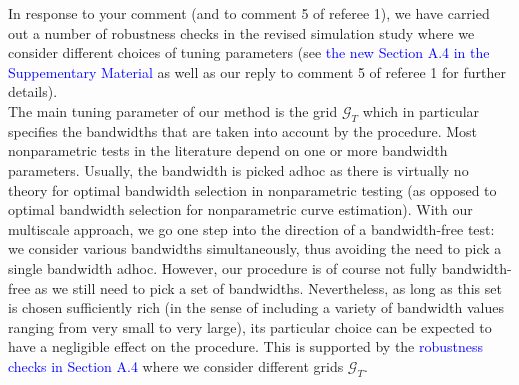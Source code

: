 \documentclass[a4paper,12pt]{article}
\begin{document}
\begin{enumerate}[label=\arabic*.,leftmargin=0.6cm]
In response to your comment (and to comment 5 of referee 1), we have carried out a number of robustness checks in the revised simulation study where we consider different choices of tuning parameters (see \textcolor{blue}{the new Section A.4 in the Suppementary Material} as well as our reply to comment 5 of referee 1 for further details). \\
The main tuning parameter of our method is the grid $\mathcal{G}_T$ which in particular specifies the bandwidths that are taken into account by the procedure.
Most nonparametric tests in the literature depend on one or more bandwidth parameters. Usually, the bandwidth is picked adhoc as there is virtually no theory for optimal bandwidth selection in nonparametric testing (as opposed to optimal bandwidth selection for nonparametric curve estimation). With our multiscale approach, we go one step into the direction of a bandwidth-free test: we consider various bandwidths simultaneously, thus avoiding the need to pick a single bandwidth adhoc. However, our procedure is of course not fully bandwidth-free as we still need to pick a set of bandwidths. Nevertheless, as long as this set is chosen sufficiently rich (in the sense of including a variety of bandwidth values ranging from very small to very large), its particular choice can be expected to have a negligible effect on the procedure. This is supported by the \textcolor{blue}{robustness checks in Section A.4} where we consider different grids $\mathcal{G}_T$. \\

\end{enumerate}
\end{document}
